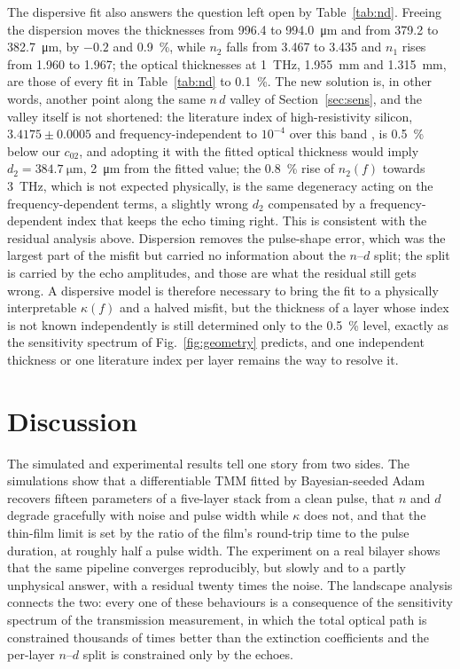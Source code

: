 \documentclass{optica-article}
\newcommand{\kap}{\kappa}
\begin{document}
The dispersive fit also answers the question left open by Table~\ref{tab:nd}. Freeing the dispersion moves the thicknesses from 996.4 to \SI{994.0}{\micro\metre} and from 379.2 to \SI{382.7}{\micro\metre}, by $-0.2$ and \SI{+0.9}{\percent}, while $n_2$ falls from 3.467 to 3.435 and $n_1$ rises from 1.960 to 1.967; the optical thicknesses at \SI{1}{THz}, \SI{1.955}{\milli\metre} and \SI{1.315}{\milli\metre}, are those of every fit in Table~\ref{tab:nd} to \SI{0.1}{\percent}. The new solution is, in other words, another point along the same $n\,d$ valley of Section~\ref{sec:sens}, and the valley itself is not shortened: the literature index of high-resistivity silicon, $3.4175\pm0.0005$ and frequency-independent to $10^{-4}$ over this band \cite{Dai2004}, is \SI{0.5}{\percent} below our $c_{02}$, and adopting it with the fitted optical thickness would imply $d_2=\SI{384.7}{\micro\metre}$, \SI{2}{\micro\metre} from the fitted value; the \SI{0.8}{\percent} rise of $n_2(f)$ towards \SI{3}{THz}, which is not expected physically, is the same degeneracy acting on the frequency-dependent terms, a slightly wrong $d_2$ compensated by a frequency-dependent index that keeps the echo timing right. This is consistent with the residual analysis above. Dispersion removes the pulse-shape error, which was the largest part of the misfit but carried no information about the $n$--$d$ split; the split is carried by the echo amplitudes, and those are what the residual still gets wrong. A dispersive model is therefore necessary to bring the fit to a physically interpretable $\kap(f)$ and a halved misfit, but the thickness of a layer whose index is not known independently is still determined only to the \SI{0.5}{\percent} level, exactly as the sensitivity spectrum of Fig.~\ref{fig:geometry} predicts, and one independent thickness or one literature index per layer remains the way to resolve it.

\section{Discussion}\label{sec:discussion}
The simulated and experimental results tell one story from two sides. The simulations show that a differentiable TMM fitted by Bayesian-seeded Adam recovers fifteen parameters of a five-layer stack from a clean pulse, that $n$ and $d$ degrade gracefully with noise and pulse width while $\kap$ does not, and that the thin-film limit is set by the ratio of the film's round-trip time to the pulse duration, at roughly half a pulse width. The experiment on a real bilayer shows that the same pipeline converges reproducibly, but slowly and to a partly unphysical answer, with a residual twenty times the noise. The landscape analysis connects the two: every one of these behaviours is a consequence of the sensitivity spectrum of the transmission measurement, in which the total optical path is constrained thousands of times better than the extinction coefficients and the per-layer $n$--$d$ split is constrained only by the echoes.
\end{document}
